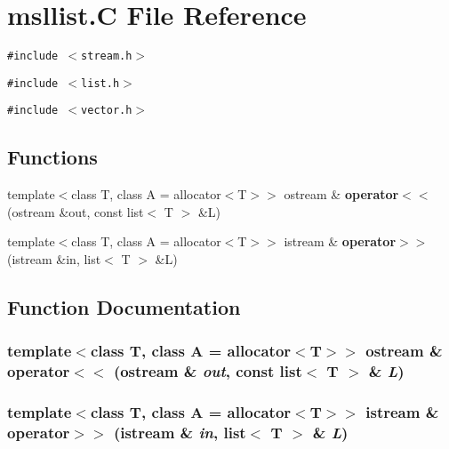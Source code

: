 \section{msllist.C File Reference}
\label{msllist_8C}
{\tt \#include $<$stream.h$>$}\par
{\tt \#include $<$list.h$>$}\par
{\tt \#include $<$vector.h$>$}\par
\subsection*{Functions}
\begin{CompactItemize}
\item 
template$<$class T, class A = allocator$<$T$>$$>$ ostream \& {\bf operator$<$$<$} (ostream \&out, const list$<$ T $>$ \&L)
\item 
template$<$class T, class A = allocator$<$T$>$$>$ istream \& {\bf operator$>$$>$} (istream \&in, list$<$ T $>$ \&L)
\end{CompactItemize}


\subsection{Function Documentation}
\subsubsection{\setlength{\rightskip}{0pt plus 5cm}template$<$class T, class A = allocator$<$T$>$$>$ ostream \& operator$<$$<$ (ostream \& {\em out}, const list$<$ T $>$ \& {\em L})}\label{msllist_8C_a0}


\subsubsection{\setlength{\rightskip}{0pt plus 5cm}template$<$class T, class A = allocator$<$T$>$$>$ istream \& operator$>$$>$ (istream \& {\em in}, list$<$ T $>$ \& {\em L})}\label{msllist_8C_a1}


